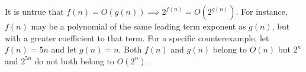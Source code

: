 It is untrue that $ f(n) = O(g(n)) \implies 2^{f(n)} = O(2^{g(n)}) $. For instance, $ f(n) $ may be a polynomial of the same leading term exponent as $ g(n) $, but with a greater coefficient to that term. For a specific counterexample, let $ f(n) = 5n $ and let $ g(n) = n $. Both $ f(n) $ and $ g(n) $ belong to $ O(n) $ but $ 2^n $ and $ 2^{5n} $ do not both belong to $ O(2^n) $.
